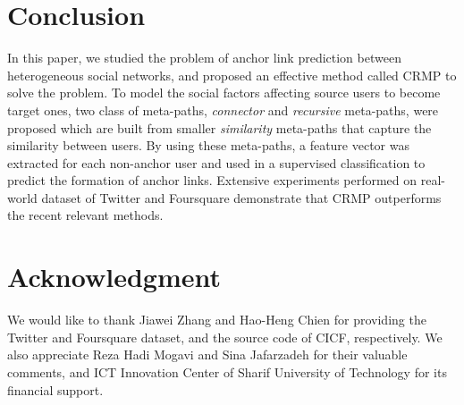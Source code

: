 \documentclass[conference]{IEEEtran}
\begin{document}
\section{Conclusion}\label{sec:conclusion}
In this paper, we studied the problem of anchor link prediction between heterogeneous social networks, and proposed an effective method called CRMP to solve the problem. To model the social factors affecting source users to become target ones, two class of meta-paths, \textit{connector} and \textit{recursive} meta-paths, were proposed which are built from smaller \textit{similarity} meta-paths that capture the similarity between users. By using these meta-paths, a feature vector was extracted for each non-anchor user and used in a supervised classification to predict the formation of anchor links. Extensive experiments performed on real-world dataset of Twitter and Foursquare demonstrate that CRMP outperforms the recent relevant methods.

\section*{Acknowledgment}
We would like to thank Jiawei Zhang and Hao-Heng Chien for providing the Twitter and Foursquare dataset, and the source code of CICF, respectively. We also appreciate Reza Hadi Mogavi and Sina Jafarzadeh for their valuable comments, and ICT Innovation Center of Sharif University of Technology for its financial support.





%






\end{document}
